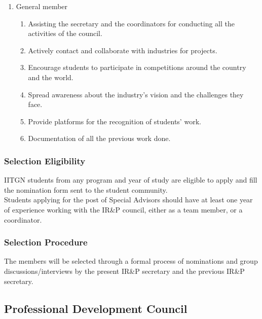 \documentclass[12pt]{article}
\begin{document}
\begin{enumerate}
\begin{enumerate}
    \end{enumerate}
    \item General member
    \begin{enumerate}
        \item Assisting the secretary and the coordinators for conducting all the activities of the council.
        \item Actively contact and collaborate with industries for projects.
        \item Encourage students to participate in competitions around the country and the world.
        \item Spread awareness about the industry's vision and the challenges they face.
        \item Provide platforms for the recognition of students’ work.
        \item Documentation of all the previous work done.
    \end{enumerate}
\end{enumerate}


\subsubsection{Selection Eligibility}
IITGN students from any program and year of study are eligible to apply and fill the nomination form sent to the student community. \\

\noindent Students applying for the post of Special Advisors should have at least one year of experience working with the IR\&P council, either as a team member, or a coordinator.

\subsubsection{Selection Procedure}
The members will be selected through a formal process of nominations
and group discussions/interviews by the present IR\&P secretary and the previous IR\&P secretary.


\newpage
\subsection{Professional Development Council}
\end{document}
